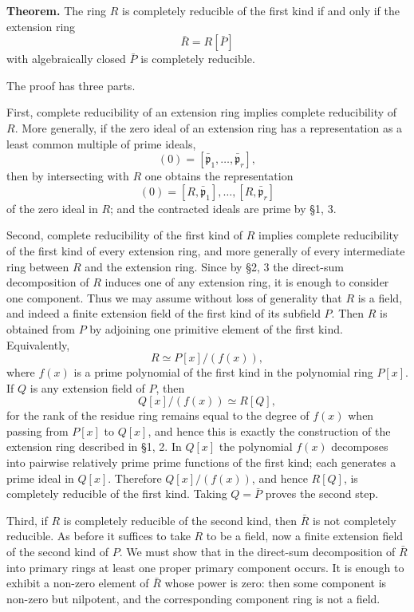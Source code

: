 \documentclass[11pt]{article}
\begin{document}
\textbf{Theorem.} The ring \(R\) is completely reducible of the first
kind if and only if the extension ring \[
  \bar R=R[\bar P]
\] with algebraically closed \(\bar P\) is completely reducible.

The proof has three parts.

First, complete reducibility of an extension ring implies complete
reducibility of \(R\). More generally, if the zero ideal of an extension
ring has a representation as a least common multiple of prime ideals, \[
  (0)=[\bar{\mathfrak p}_1,
\ldots,\bar{\mathfrak p}_r],
\] then by intersecting with \(R\) one obtains the representation \[
  (0)=[R,\bar{\mathfrak p}_1],
\ldots,[R,\bar{\mathfrak p}_r]
\] of the zero ideal in \(R\); and the contracted ideals are prime by
§1, 3.

Second, complete reducibility of the first kind of \(R\) implies
complete reducibility of the first kind of every extension ring, and
more generally of every intermediate ring between \(R\) and the
extension ring. Since by §2, 3 the direct-sum decomposition of \(R\)
induces one of any extension ring, it is enough to consider one
component. Thus we may assume without loss of generality that \(R\) is a
field, and indeed a finite extension field of the first kind of its
subfield \(P\). Then \(R\) is obtained from \(P\) by adjoining one
primitive element of the first kind. Equivalently, \[
  R\simeq P[x]/(f(x)),
\] where \(f(x)\) is a prime polynomial of the first kind in the
polynomial ring \(P[x]\). If \(Q\) is any extension field of \(P\), then
\[
  Q[x]/(f(x))\simeq R[Q],
\] for the rank of the residue ring remains equal to the degree of
\(f(x)\) when passing from \(P[x]\) to \(Q[x]\), and hence this is
exactly the construction of the extension ring described in §1, 2. In
\(Q[x]\) the polynomial \(f(x)\) decomposes into pairwise relatively
prime prime functions of the first kind; each generates a prime ideal in
\(Q[x]\). Therefore \(Q[x]/(f(x))\), and hence \(R[Q]\), is completely
reducible of the first kind. Taking \(Q=\bar P\) proves the second step.

Third, if \(R\) is completely reducible of the second kind, then
\(\bar R\) is not completely reducible. As before it suffices to take
\(R\) to be a field, now a finite extension field of the second kind of
\(P\). We must show that in the direct-sum decomposition of \(\bar R\)
into primary rings at least one proper primary component occurs. It is
enough to exhibit a non-zero element of \(\bar R\) whose power is zero:
then some component is non-zero but nilpotent, and the corresponding
component ring is not a field.
\end{document}
